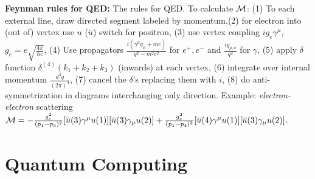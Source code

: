 {\bf Feynman rules for QED:}  The rules for QED.
To calculate ${\cal M}$: (1) To each external line, draw directed segment
labeled by momentum,(2) for electron into (out of)
vertex use $u$ (${\overline u}$) switch for positron, (3) use vertex coupling $ig_e \gamma^{\mu}$, $g_e= e {\sqrt {\frac {4 \pi} {\hbar c}}}$,
(4) Use propagators ${\frac {i(\gamma^{\mu} q_{\mu} + mc)} {q^2-m^2 c^2}}$ for $e^+,
e^-$ and ${\frac {ig_{\mu, \nu}} {q^2}}$ for
$\gamma$, (5) apply $\delta$ function $\delta^{(4)}(k_1+k_2+k_3)$ (inwards) at each vertex, (6) integrate over internal momentum
${\frac {d^4 q} {(2 \pi)^4}}$, (7) cancel the $\delta$'s replacing them with $i$, (8) do anti-symmetrization in diagrams interchanging only
direction.  Example: \emph{electron-electron} scattering ${\cal M}= 
- {\frac {g_e^2}{(p_1-p_3)^2}} [{\overline u}(3) \gamma^{\mu}u(1)] [{\overline u}(3) \gamma_{\mu} u(2)]
+ {\frac {g_e^2}{(p_1-p_4)^2}} [{\overline u}(4) \gamma^{\mu}u(1)] [{\overline u}(3) \gamma_{\mu} u(2)] $.
\chapter{Quantum Computing}
